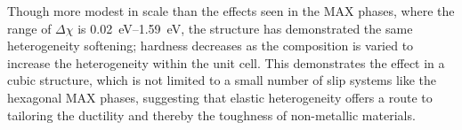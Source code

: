 Though more modest in scale than the effects seen in the MAX phases, where the range of $\Delta \chi$ is \SIrange{0.02}{1.59}{\electronvolt}, the  structure has demonstrated the same heterogeneity softening; hardness decreases as the composition is varied to increase the heterogeneity within the unit cell. This demonstrates the effect in a cubic structure, which is not limited to a small number of slip systems like the hexagonal MAX phases, suggesting that elastic heterogeneity offers a route to tailoring the ductility and thereby the toughness of non-metallic materials.
















































